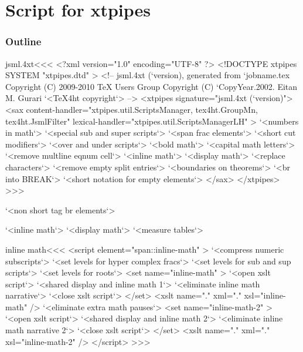 \documentclass{article}
\begin{document}



\part{Script for xtpipes}


\section{Outline}




\<jsml.4xt\><<<
<?xml version="1.0" encoding="UTF-8" ?>
<!DOCTYPE xtpipes SYSTEM "xtpipes.dtd" >
<!-- jsml.4xt (`version), generated from `jobname.tex
     Copyright (C) 2009-2010 TeX Users Group
     Copyright (C) `CopyYear.2002. Eitan M. Gurari
`<TeX4ht copyright`> -->
<xtpipes signature="jsml.4xt (`version)">
   <sax content-handler="xtpipes.util.ScriptsManager, tex4ht.GroupMn, tex4ht.JsmlFilter" 
        lexical-handler="xtpipes.util.ScriptsManagerLH" >
     `<numbers in math`>
     `<special sub and super scripts`> 
     `<span frac elements`>
     `<short cut modifiers`>
     `<over and under scripts`>
     `<bold math`>
     `<capital math letters`>
     `<remove multline eqnum cell`> 
     `<inline math`>
     `<display math`>
     `<replace characters`>
     `<remove empty split entries`>
     `<boundaries on theorems`>
     `<br into BREAK`>
     `<short notation for empty elements`>
   </sax>
</xtpipes>
>>>


     `<non short tag br elements`>     

     `<inline math`>
     `<display math`>
     `<measure tables`>




\<inline math\><<<
<script element="span::inline-math" >
  `<compress numeric subscripts`>
  `<set levels for hyper complex fracs`>
  `<set levels for sub and sup scripts`>
  `<set levels for roots`>
  <set name="inline-math" >
     `<open xslt script`>
     `<shared display and inline math 1`>
     `<eliminate inline math narrative`>
     `<close xslt script`>
  </set>
  <xslt name="." xml="." xsl="inline-math" />
  `<eliminate extra math pauses`>
  <set name="inline-math-2" >
     `<open xslt script`>
     `<shared display and inline math 2`>
     `<eliminate inline math narrative 2`>
     `<close xslt script`>
  </set>
  <xslt name="." xml="." xsl="inline-math-2" />
</script> 
>>>
\end{document}
